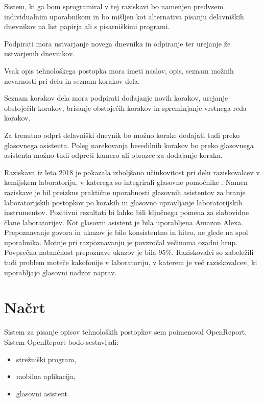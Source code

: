 \documentclass[a4paper, 12pt]{book}
\begin{document}
Sistem, ki ga bom sprogramiral v tej raziskavi bo namenjen predvsem individualnim uporabnikom in bo mišljen kot alternativa pisanju delavniških dnevnikov na list papirja ali s pisarniškimi programi.

Podpirati mora ustvarjanje novega dnevnika in odpiranje ter urejanje že ustvarjenih dnevnikov.

Vsak opis tehnološkega postopka mora imeti naslov, opis, seznam možnih nevarnosti pri delu in seznam korakov dela.

Seznam korakov dela mora podpirati dodajanje novih korakov, urejanje obstoječih korakov, brisanje obstoječih korakov in spreminjanje vrstnega reda korakov.

Za trenutno odprt delavniški dnevnik bo možno korake dodajati tudi preko glasovnega asistenta.
Poleg narekovanja besedilnih korakov bo preko glasovnega asistenta možno tudi odpreti kamero ali obrazec za dodajanje koraka.

Raziskava iz leta 2018 je pokazala izboljšano učinkovitost pri delu raziskovalcev v kemijskem laboratoriju, v katerega so integrirali glasovne pomočnike \cite{austerjost2018introducing}.
Namen raziskave je bil preizkus praktične uporabnosti glasovnih asistentov za branje laboratorijskih postopkov po korakih in glasovno upravljanje laboratorijskih instrumentov.
Pozitivni rezultati bi lahko bili ključnega pomena za slabovidne člane laboratorijev.
Kot glasovni asistent je bila uporabljena Amazon Alexa.
Prepoznavanje govora in ukazov je bilo konsistentno in hitro, ne glede na spol uporabnika.
Motnje pri razpoznavanju je povzročal večinoma ozadni hrup.
Povprečna natančnost prepoznave ukazov je bila 95\%.
Raziskovalci so zabeležili tudi problem moteče kakofonije v laboratoriju, v katerem je več raziskovalcev, ki uporabljajo glasovni nadzor naprav.

\section{Načrt}

Sistem za pisanje opisov tehnoloških postopkov sem poimenoval OpenReport. 
Sistem OpenReport bodo sestavljali:

\begin{itemize}
	\item strežniški program, 
	\item mobilna aplikacija,
	\item glasovni asistent.
\end{itemize}
\end{document}
